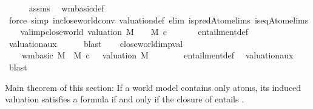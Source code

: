 \begin{isabellebody}
\ \ \ \ %
\endisadelimproof
%
\isatagproof
{}\isamarkupfalse%
\ assms\ \isamarkupfalse%
\ wm{\isacharunderscore}{\kern0pt}basic{\isacharunderscore}{\kern0pt}def\isanewline
\ \ \ \ \isamarkupfalse%
\ {\isacharparenleft}{\kern0pt}force\ simp{\isacharcolon}{\kern0pt}\ in{\isacharunderscore}{\kern0pt}close{\isacharunderscore}{\kern0pt}world{\isacharunderscore}{\kern0pt}conv\ valuation{\isacharunderscore}{\kern0pt}def\ elim{\isacharcolon}{\kern0pt}\ is{\isacharunderscore}{\kern0pt}predAtom{\isachardot}{\kern0pt}elims\ is{\isacharunderscore}{\kern0pt}eqAtom{\isachardot}{\kern0pt}elims{\isacharparenright}{\kern0pt}%
\endisatagproof
{\isafoldproof}%
%
\isadelimproof
\isanewline
%
\endisadelimproof
\isanewline
\ \ \isamarkupfalse%
\ val{\isacharunderscore}{\kern0pt}imp{\isacharunderscore}{\kern0pt}close{\isacharunderscore}{\kern0pt}world{\isacharcolon}{\kern0pt}\ {\isachardoublequoteopen}valuation\ M\ {\isasymTurnstile}\ {\isasymphi}\ {\isasymLongrightarrow}\ M\ \isactrlsup c{\isasymTTurnstile}\isactrlsub {\isacharequal}{\kern0pt}\ {\isasymphi}{\isachardoublequoteclose}\isanewline
%
\isadelimproof
\ \ \ \ %
\endisadelimproof
%
\isatagproof
{}\isamarkupfalse%
\ entailment{\isacharunderscore}{\kern0pt}def\isanewline
\ \ \ \ \isamarkupfalse%
\ valuation{\isacharunderscore}{\kern0pt}aux{\isacharunderscore}{\kern0pt}{}\isanewline
\ \ \ \ \isamarkupfalse%
\ blast%
\endisatagproof
{\isafoldproof}%
%
\isadelimproof
\isanewline
%
\endisadelimproof
\isanewline
\ \ \isamarkupfalse%
\ close{\isacharunderscore}{\kern0pt}world{\isacharunderscore}{\kern0pt}imp{\isacharunderscore}{\kern0pt}val{\isacharcolon}{\kern0pt}\isanewline
\ \ \ \ {\isachardoublequoteopen}wm{\isacharunderscore}{\kern0pt}basic\ M\ {\isasymLongrightarrow}\ M\ \isactrlsup c{\isasymTTurnstile}\isactrlsub {\isacharequal}{\kern0pt}\ {\isasymphi}\ {\isasymLongrightarrow}\ valuation\ M\ {\isasymTurnstile}\ {\isasymphi}{\isachardoublequoteclose}\isanewline
%
\isadelimproof
\ \ \ \ %
\endisadelimproof
%
\isatagproof
{}\isamarkupfalse%
\ entailment{\isacharunderscore}{\kern0pt}def\ \isamarkupfalse%
\ valuation{\isacharunderscore}{\kern0pt}aux{\isacharunderscore}{\kern0pt}{}\ \isamarkupfalse%
\ blast%
\endisatagproof
{\isafoldproof}%
%
\isadelimproof
%
\endisadelimproof
%
\begin{isamarkuptext}%
Main theorem of this section:
    If a world model  contains only atoms, its induced valuation
    satisfies a formula \isa{{\isasymphi}} if and only if the closure of  entails \isa{{\isasymphi}}.


\end{isamarkuptext}
\end{isabellebody}
